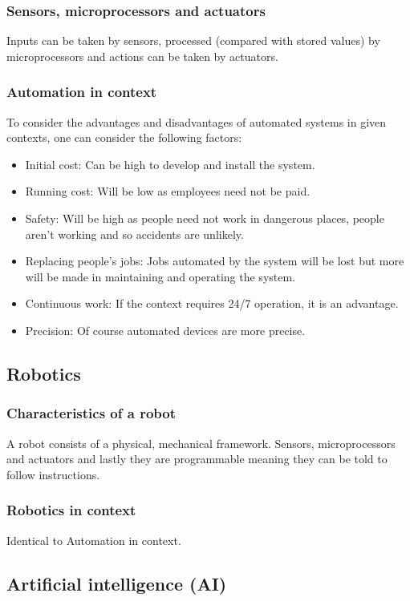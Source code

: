 \documentclass{article}
\begin{document}
\subsubsection{Sensors, microprocessors and actuators}
Inputs can be taken by sensors, processed (compared with stored values) by 
microprocessors and actions can be taken by actuators.
	
\subsubsection{Automation in context}
To consider the advantages and disadvantages of automated systems in given contexts,
one can consider the following factors:
\begin{itemize}
	\item Initial cost: Can be high to develop and install the system.
	\item Running cost: Will be low as employees need not be paid.
	\item Safety: Will be high as people need not work in dangerous places, people
		aren't working and so accidents are unlikely.
	\item Replacing people's jobs: Jobs automated by the system will be lost but more
		will be made in maintaining and operating the system.
	\item Continuous work: If the context requires 24/7 operation, it is an advantage.
	\item Precision: Of course automated devices are more precise.
\end{itemize}
\subsection{Robotics}
\subsubsection{Characteristics of a robot}
A robot consists of a physical, mechanical framework. Sensors, microprocessors and
actuators and lastly they are programmable meaning they can be told to follow 
instructions.
\subsubsection{Robotics in context}
Identical to Automation in context.

\subsection{Artificial intelligence (AI)}
\end{document}
